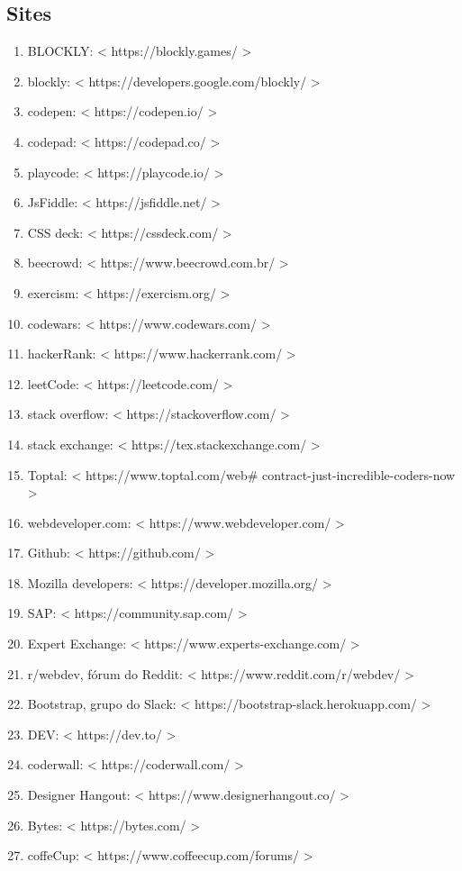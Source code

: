 \documentclass[12pt,a4paper]{article} %
\begin{document}
\subsection{Sites}
\begin{enumerate}
\item BLOCKLY: < https://blockly.games/ >
\item blockly: < https://developers.google.com/blockly/ >
\item codepen: < https://codepen.io/ >
\item codepad: < https://codepad.co/ >
\item playcode: < https://playcode.io/ >
\item JsFiddle: < https://jsfiddle.net/ >
\item CSS deck: < https://cssdeck.com/ >
\item beecrowd: < https://www.beecrowd.com.br/ >
\item exercism: < https://exercism.org/ >
\item codewars: < https://www.codewars.com/ >
\item hackerRank: < https://www.hackerrank.com/ >
\item leetCode: < https://leetcode.com/ >
\item stack overflow: < https://stackoverflow.com/ >
\item stack exchange: < https://tex.stackexchange.com/ >
\item Toptal: < https://www.toptal.com/web\# contract-just-incredible-coders-now >
\item webdeveloper.com: < https://www.webdeveloper.com/ >
\item Github: < https://github.com/ >
\item Mozilla developers: < https://developer.mozilla.org/ >
\item SAP: < https://community.sap.com/ >
\item Expert Exchange: < https://www.experts-exchange.com/ >
\item r/webdev, fórum do Reddit: < https://www.reddit.com/r/webdev/ >
\item Bootstrap, grupo do Slack: < https://bootstrap-slack.herokuapp.com/ >
\item DEV: < https://dev.to/ >
\item coderwall: < https://coderwall.com/ >
\item Designer Hangout: < https://www.designerhangout.co/ >
\item Bytes: < https://bytes.com/ >
\item coffeCup: < https://www.coffeecup.com/forums/ >

\end{enumerate}
\end{document}
